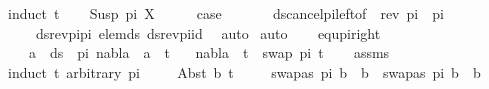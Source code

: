 \begin{isabellebody}
%
\endisadelimproof
%
\isatagproof
{}\isamarkupfalse%
{\isacharparenleft}{\kern0pt}induct\ t{\isacharparenright}{\kern0pt}\isanewline
\ \ \isamarkupfalse%
\ {\isacharparenleft}{\kern0pt}Susp\ pi{\isacharprime}{\kern0pt}\ X{\isacharparenright}{\kern0pt}\isanewline
\ \ \isamarkupfalse%
\ \isamarkupfalse%
\ {\isacharquery}{\kern0pt}case\ \isanewline
\ \ \ \ \isamarkupfalse%
\ ds{\isacharunderscore}{\kern0pt}cancel{\isacharunderscore}{\kern0pt}pi{\isacharunderscore}{\kern0pt}left{\isacharbrackleft}{\kern0pt}of\ {\isacharunderscore}{\kern0pt}\ {\isacartoucheopen}rev\ pi\ {\isacharat}{\kern0pt}\ pi{\isacartoucheclose}\ {\isacharunderscore}{\kern0pt}\ {\isacartoucheopen}{\isacharbrackleft}{\kern0pt}{\isacharbrackright}{\kern0pt}{\isacartoucheclose}{\isacharbrackright}{\kern0pt}\isanewline
\ \ \ \ ds{\isacharunderscore}{\kern0pt}rev{\isacharunderscore}{\kern0pt}pi{\isacharunderscore}{\kern0pt}pi\ elem{\isacharunderscore}{\kern0pt}ds\ ds{\isacharunderscore}{\kern0pt}rev{\isacharunderscore}{\kern0pt}pi{\isacharunderscore}{\kern0pt}id\ \isamarkupfalse%
\ auto\isanewline
{}\isamarkupfalse%
\ {\isacharparenleft}{\kern0pt}auto{\isacharparenright}{\kern0pt}%
\endisatagproof
{\isafoldproof}%
%
\isadelimproof
\isanewline
%
\endisadelimproof
\ \ \isanewline
{}\isamarkupfalse%
\ equ{\isacharunderscore}{\kern0pt}pi{\isacharunderscore}{\kern0pt}right{\isacharcolon}{\kern0pt}\ \isanewline
\ \ \ {\isachardoublequoteopen}{\isasymforall}a\ {\isasymin}\ ds\ {\isacharbrackleft}{\kern0pt}{\isacharbrackright}{\kern0pt}\ pi{\isachardot}{\kern0pt}\ nabla\ {\isasymturnstile}\ a\ {\isasymsharp}\ t{\isachardoublequoteclose}\isanewline
\ \ \ {\isachardoublequoteopen}nabla\ {\isasymturnstile}\ t\ {\isasymapprox}\ swap\ pi\ t{\isachardoublequoteclose}\isanewline
%
\isadelimproof
\ \ %
\endisadelimproof
%
\isatagproof
{}\isamarkupfalse%
\ assms\isanewline
{}\isamarkupfalse%
{\isacharparenleft}{\kern0pt}induct\ t\ arbitrary{\isacharcolon}{\kern0pt}\ pi{\isacharparenright}{\kern0pt}\isanewline
\ \ \ \isamarkupfalse%
\ {\isacharparenleft}{\kern0pt}Abst\ b\ t{\isacharprime}{\kern0pt}{\isacharparenright}{\kern0pt}\isanewline
\ \ \ \isamarkupfalse%
\ {\isachardoublequoteopen}swapas\ pi\ b\ {\isacharequal}{\kern0pt}\ b\ {\isasymor}\ swapas\ pi\ b\ {\isasymnoteq}\ b{\isachardoublequoteclose}\ \isamarkupfalse%

\end{isabellebody}
